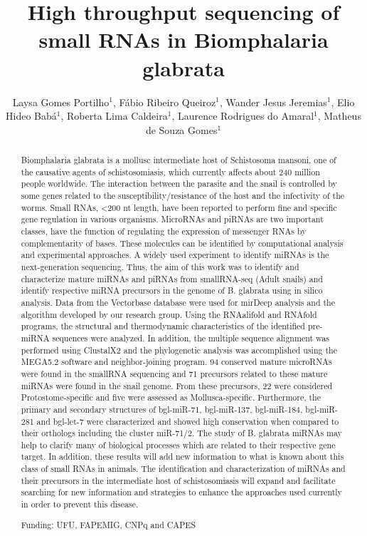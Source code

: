\documentclass[twoside]{article}
\title{\vspace{-15mm}\fontsize{24pt}{10pt}\selectfont\textbf{High throughput sequencing of small RNAs in Biomphalaria glabrata}} %
\author{Laysa Gomes Portilho$^1$, F\'abio Ribeiro Queiroz$^1$, Wander Jesus Jeremias$^1$, Elio Hideo Bab\'a$^1$, Roberta Lima Caldeira$^1$, Laurence Rodrigues do Amaral$^1$, Matheus de Souza Gomes$^1$}
\affil{1 UFU\\ }
\date{}
\begin{document}
\maketitle %

\thispagestyle{fancy} %


\begin{abstract}
Biomphalaria glabrata is a mollusc intermediate host of Schistosoma mansoni, one of the causative agents of schistosomiasis, which currently affects about 240 million people worldwide. The interaction between the parasite and the snail is controlled by some genes related to the susceptibility/resistance of the host and the infectivity of the worms. Small RNAs, <200 nt length, have been reported to perform fine and specific gene regulation in various organisms. MicroRNAs and piRNAs are two important classes, have the function of regulating the expression of messenger RNAs by complementarity of bases. These molecules can be identified by computational analysis and experimental approaches. A widely used experiment to identify miRNAs is the next-generation sequencing. Thus, the aim of this work was to identify and characterize mature miRNAs and piRNAs from smallRNA-seq (Adult snails) and identify respective miRNA precursors in the genome of B. glabrata using in silico analysis. Data from the Vectorbase database were used for mirDeep analysis and the algorithm developed by our research group. Using the RNAalifold and RNAfold programs, the structural and thermodynamic characteristics of the identified pre-miRNA sequences were analyzed. In addition, the multiple sequence alignment was performed using ClustalX2 and the phylogenetic analysis was accomplished using the MEGA5.2 software and neighbor-joining program. 94 conserved mature microRNAs were found in the smallRNA sequencing and 71 precursors related to these mature miRNAs were found in the snail genome. From these precursors, 22 were considered Protostome-specific and five were assessed as Mollusca-specific. Furthermore, the primary and secondary structures of bgl-miR-71, bgl-miR-137, bgl-miR-184, bgl-miR-281 and bgl-let-7 were characterized and showed high conservation when compared to their orthologs including the cluster miR-71/2. The study of B. glabrata miRNAs may help to clarify many of biological processes which are related to their respective gene target. In addition, these results will add new information to what is known about this class of small RNAs in animals. The identification and characterization of miRNAs and their precursors in the intermediate host of schistosomiasis will expand and facilitate searching for new information and strategies to enhance the approaches used currently in order to prevent this disease.

Funding: UFU, FAPEMIG, CNPq and CAPES
\end{abstract}
\end{document}
